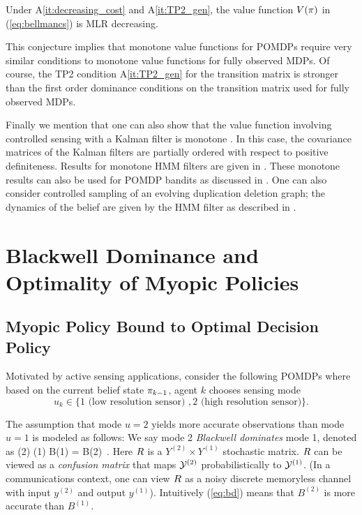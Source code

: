 \documentclass[draftcls,onecolumn]{IEEEtran}
\begin{document}
\begin{conjecture} Under A\ref{it:decreasing_cost} and   A\ref{it:TP2_gen}, the value function $V(\pi)$ in (\ref{eq:bellmancs}) is MLR decreasing.
\end{conjecture}

This conjecture implies that monotone value functions for POMDPs require very similar conditions to monotone value functions for fully observed MDPs.
Of course, the TP2 condition  A\ref{it:TP2_gen} for the transition matrix is stronger than the first order dominance conditions on the transition matrix used for fully observed MDPs.

Finally we mention that one can also show that the value function involving controlled sensing with a Kalman filter is monotone \cite{KBGM12}.  In this case, the covariance matrices of the Kalman filters
are partially ordered with respect to positive definiteness.
Results for monotone HMM filters are given in 
\cite{KR14}. These monotone results can also be used for POMDP bandits as discussed in \cite{KW09}. One can also consider controlled sampling of an evolving duplication deletion graph; the dynamics of the belief
are given by the HMM filter as described in \cite{KBP16}.



\section{Blackwell Dominance and Optimality of Myopic Policies}


\subsection{Myopic Policy Bound to Optimal Decision Policy} \label{sec:myopic}

Motivated by active sensing applications, consider the following POMDPs where
based on the current
belief state $\pi_{k-1}$, agent $k$ chooses sensing mode $$u_k \in \{1 \text{ (low resolution sensor) }, 2 \text{ (high resolution sensor)}\}.$$

The assumption that mode $u=2$ yields more accurate observations than mode $u=1$ is modeled as follows: We say mode 2 {\em Blackwell
dominates} mode 1, denoted as 
\beq \label{eq:bd}
  \oprob(2) \bd \oprob(1)\quad  {}  \quad  B(1)  = B(2)\, \aB . \eeq
   Here $R$ is a $Y^{(2)} \times Y^{(1)}$ stochastic matrix. $R$ can be viewed as a {\em confusion matrix} that maps $\mathcal{Y}^{(2)}$ probabilistically to $\mathcal{Y}^{(1)}$.
   (In a communications context, one can view $R$ as a noisy discrete memoryless channel with input $y^{(2)}$ and output $y^{(1)}$).
Intuitively (\ref{eq:bd})  means that
  $B^{(2)} $ is more accurate than   $B^{(1)} $.
\end{document}
